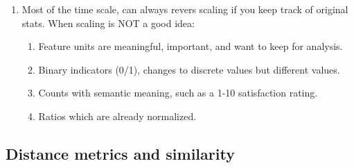 \documentclass{article}
\begin{document}
\begin{enumerate}
\item Most of the time scale, can always revers scaling if you keep track of original stats. When scaling is NOT a good idea:
\begin{enumerate}
\item Feature units are meaningful, important, and want to keep for analysis.
\item Binary indicators (0/1), changes to discrete values but different values.
\item Counts with semantic meaning, such as a 1-10 satisfaction rating.
\item Ratios which are already normalized.
\end{enumerate}
\end{enumerate}

\subsection*{Distance metrics and similarity}
\end{document}
